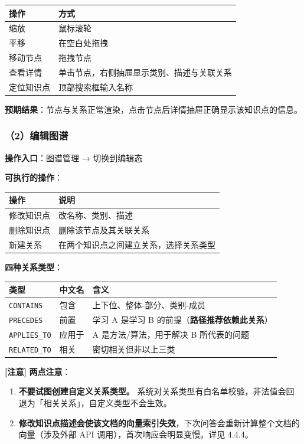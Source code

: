 \documentclass[UTF8,a4paper,11pt]{ctexrep}
\newcommand{\warnmark}{\textcolor{todobar}{\textbf{[注意]}}}
\begin{document}
\begin{center}
\small
\begin{tabularx}{\linewidth}{@{}XX@{}}
\toprule
操作 & 方式 \\
\midrule
缩放 & 鼠标滚轮 \\
平移 & 在空白处拖拽 \\
移动节点 & 拖拽节点 \\
查看详情 & 单击节点，右侧抽屉显示类别、描述与关联关系 \\
定位知识点 & 顶部搜索框输入名称 \\
\bottomrule
\end{tabularx}
\end{center}
\textbf{预期结果}：节点与关系正常渲染，点击节点后详情抽屉正确显示该知识点的信息。


\subsubsection{（2）编辑图谱}

\textbf{操作入口}：图谱管理 → 切换到编辑态

\textbf{可执行的操作}：

\begin{center}
\small
\begin{tabularx}{\linewidth}{@{}XX@{}}
\toprule
操作 & 说明 \\
\midrule
修改知识点 & 改名称、类别、描述 \\
删除知识点 & 删除该节点及其关联关系 \\
新建关系 & 在两个知识点之间建立关系，选择关系类型 \\
\bottomrule
\end{tabularx}
\end{center}
\textbf{四种关系类型}：

\begin{center}
\small
\begin{tabularx}{\linewidth}{@{}XXX@{}}
\toprule
类型 & 中文名 & 含义 \\
\midrule
\texttt{CONTAINS} & 包含 & 上下位、整体-部分、类别-成员 \\
\texttt{PRECEDES} & 前置 & 学习 A 是学习 B 的前提（\textbf{路径推荐依赖此关系}） \\
\texttt{APPLIES\_TO} & 应用于 & A 是方法/算法，用于解决 B 所代表的问题 \\
\texttt{RELATED\_TO} & 相关 & 密切相关但非以上三类 \\
\bottomrule
\end{tabularx}
\end{center}
\begin{todobox}
\warnmark{} \textbf{两点注意}：

\begin{enumerate}
\item \textbf{不要试图创建自定义关系类型。} 系统对关系类型有白名单校验，非法值会回退为「相关关系」，自定义类型不会生效。
\item \textbf{修改知识点描述会使该文档的向量索引失效}，下次问答会重新计算整个文档的向量（涉及外部 API 调用），首次响应会明显变慢。详见 4.4.4。
\end{enumerate}
\end{todobox}
\end{document}

